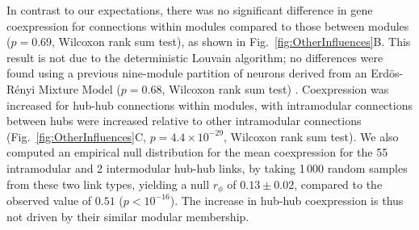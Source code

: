 \documentclass[10pt,letterpaper]{article}
\begin{document}
In contrast to our expectations, there was no significant difference in gene coexpression for connections within modules compared to those between modules ($p = 0.69$, Wilcoxon rank sum test), as shown in Fig.~\ref{fig:OtherInfluences}B.
This result is not due to the deterministic Louvain algorithm; no differences were found using a previous nine-module partition of neurons derived from an Erd\"os-R\'enyi Mixture Model ($p = 0.68$, Wilcoxon rank sum test) \cite{Pavlovic2014}.
Coexpression was increased for hub-hub connections within modules, with intramodular connections between hubs were increased relative to other intramodular connections (Fig.~\ref{fig:OtherInfluences}C, $p = 4.4\times 10^{-29}$, Wilcoxon rank sum test).
We also computed an empirical null distribution for the mean coexpression for the 55 intramodular and 2 intermodular hub-hub links, by taking 1\,000 random samples from these two link types, yielding a null $r_\phi$ of $0.13 \pm 0.02$, compared to the observed value of $0.51$ ($p < 10^{-16}$).
The increase in hub-hub coexpression is thus not driven by their similar modular membership.

\end{document}
